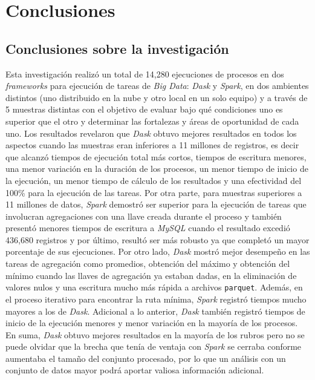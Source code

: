 \chapter*{Conclusiones}


\section{Conclusiones sobre la investigación}

Esta investigación realizó un total de 14,280 ejecuciones de procesos en dos \textit{frameworks} para ejecución de tareas de \textit{Big Data}: \textit{Dask} y \textit{Spark}, en dos ambientes distintos (uno distribuido en la nube y otro local en un solo equipo) y a través de 5 muestras distintas con el objetivo de evaluar bajo qué condiciones uno es superior que el otro y determinar las fortalezas y áreas de oportunidad de cada uno. Los resultados revelaron que \textit{Dask} obtuvo mejores resultados en todos los aspectos cuando las muestras eran inferiores a 11 millones de registros, es decir que alcanzó tiempos de ejecución total más cortos, tiempos de escritura menores, una menor variación en la duración de los procesos, un menor tiempo de inicio de la ejecución, un menor tiempo de cálculo de los resultados y una efectividad del 100\% para la ejecución de las tareas. Por otra parte, para muestras superiores a 11 millones de datos, \textit{Spark} demostró ser superior para la ejecución de tareas que involucran agregaciones con una llave creada durante el proceso y también presentó menores tiempos de escritura a \textit{MySQL} cuando el resultado excedió 436,680 registros y por último, resultó ser más robusto ya que completó un mayor porcentaje de sus ejecuciones. Por otro lado, \textit{Dask} mostró mejor desempeño en las tareas de agregación como promedios, obtención del máximo y obtención del mínimo cuando las llaves de agregación ya estaban dadas, en la eliminación de valores nulos y una escritura mucho más rápida a archivos \texttt{parquet}. Además, en el proceso iterativo para encontrar la ruta mínima, \textit{Spark} registró tiempos mucho mayores a los de \textit{Dask}. Adicional a lo anterior, \textit{Dask} también registró tiempos de inicio de la ejecución menores y menor variación en la mayoría de los procesos.  En suma, \textit{Dask} obtuvo mejores resultados en la mayoría de los rubros pero no se puede olvidar que la brecha que tenía de ventaja con \textit{Spark} se cerraba conforme aumentaba el tamaño del conjunto procesado, por lo que un análisis con un conjunto de datos mayor podrá aportar valiosa información adicional.

